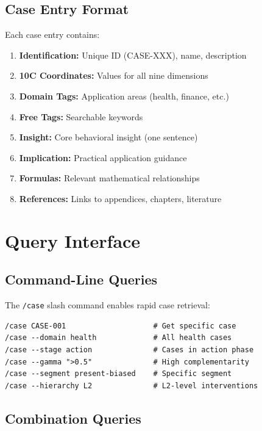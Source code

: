 \subsection{Case Entry Format}

Each case entry contains:

\begin{enumerate}
    \item \textbf{Identification:} Unique ID (CASE-XXX), name, description
    \item \textbf{10C Coordinates:} Values for all nine dimensions
    \item \textbf{Domain Tags:} Application areas (health, finance, etc.)
    \item \textbf{Free Tags:} Searchable keywords
    \item \textbf{Insight:} Core behavioral insight (one sentence)
    \item \textbf{Implication:} Practical application guidance
    \item \textbf{Formulas:} Relevant mathematical relationships
    \item \textbf{References:} Links to appendices, chapters, literature
\end{enumerate}

\section{Query Interface}

\subsection{Command-Line Queries}

The \texttt{/case} slash command enables rapid case retrieval:

\begin{verbatim}
/case CASE-001                    # Get specific case
/case --domain health             # All health cases
/case --stage action              # Cases in action phase
/case --gamma ">0.5"              # High complementarity
/case --segment present-biased    # Specific segment
/case --hierarchy L2              # L2-level interventions
\end{verbatim}

\subsection{Combination Queries}

